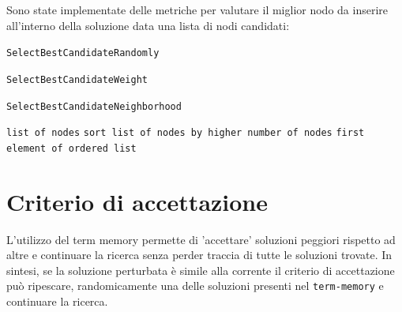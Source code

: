 \documentclass[11pt]{article}
\begin{document}
Sono state implementate delle metriche per valutare il miglior nodo da inserire all'interno della soluzione data una lista di nodi candidati:

\begin{algorithm}
\caption{\texttt{SelectBestCandidateRandomly}}
\begin{algorithmic}
    \State {}
\end{algorithmic}
\end{algorithm}

\begin{algorithm}
\caption{\texttt{SelectBestCandidateWeight}}
\begin{algorithmic}
\end{algorithmic}
\end{algorithm}

\begin{algorithm}
\caption{\texttt{SelectBestCandidateNeighborhood}}
\begin{algorithmic}
    \Require \texttt{list of nodes}
    \State \texttt{sort list of nodes by higher number of nodes}
    \State \Return \texttt{first element of ordered list}
\end{algorithmic}
\end{algorithm}

\pagebreak

\section{Criterio di accettazione}

L'utilizzo del term memory permette di 'accettare' soluzioni peggiori rispetto ad altre e continuare la ricerca senza perder traccia di tutte le soluzioni trovate.
In sintesi, se la soluzione perturbata è simile alla corrente il criterio di accettazione può ripescare, randomicamente una delle soluzioni presenti nel \verb|term-memory| e continuare la ricerca.
\end{document}
